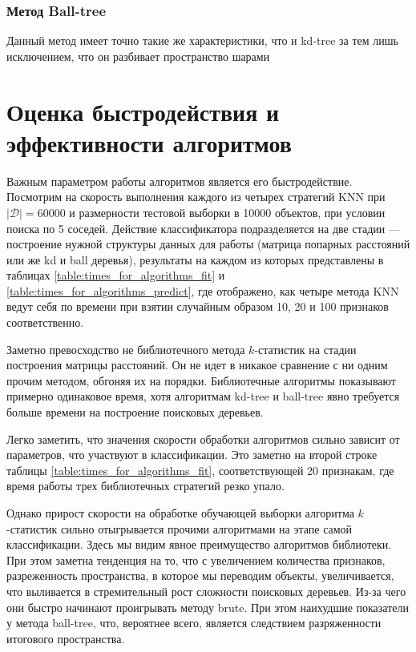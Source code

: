 \documentclass{article}
\begin{document}
        \subsubsection{Метод Ball-tree}
            Данный метод имеет точно такие же характеристики, что и kd-tree за тем лишь исключением, что он разбивает пространство шарами

\section{Оценка быстродействия и эффективности алгоритмов}

    Важным параметром работы алгоритмов является его быстродействие. Посмотрим на скорость выполнения каждого из четырех стратегий KNN при $|\mathcal{D}| = 60000$ и размерности тестовой выборки в 10000 объектов, при условии поиска по 5 соседей. Действие классификатора подразделяется на две стадии — построение нужной структуры данных для работы (матрица попарных расстояний или же kd и ball деревья), результаты на каждом из которых представлены в таблицах \ref{table:times_for_algorithms_fit} и \ref{table:times_for_algorithms_predict}, где отображено, как четыре метода KNN ведут себя по времени при взятии случайным образом 10, 20 и 100 признаков соответственно.

    Заметно превосходство не библиотечного метода $k$-статистик на стадии построения матрицы расстояний. Он не идет в никакое сравнение с ни одним прочим методом, обгоняя их на порядки. Библиотечные алгоритмы показывают примерно одинаковое время, хотя алгоритмам kd-tree и ball-tree явно требуется больше времени на построение поисковых деревьев.

    \begin{leftrule}
        Легко заметить, что значения скорости обработки алгоритмов сильно зависит от параметров, что участвуют в классификации. Это заметно на второй строке таблицы \ref{table:times_for_algorithms_fit}, соответствующей 20 признакам, где время работы трех библиотечных стратегий резко упало. 
    \end{leftrule}

    Однако прирост скорости на обработке обучающей выборки алгоритма $k$-статистик сильно отыгрывается прочими алгоритмами на этапе самой классификации. Здесь мы видим явное преимущество алгоритмов библиотеки. При этом заметна тенденция на то, что с увеличением количества признаков, разреженность пространства, в которое мы переводим объекты, увеличивается, что выливается в стремительный рост сложности поисковых деревьев. Из-за чего они быстро начинают проигрывать методу  brute. При этом наихудшие показатели у метода ball-tree, что, вероятнее всего, является следствием разряженности итогового пространства.
\end{document}
